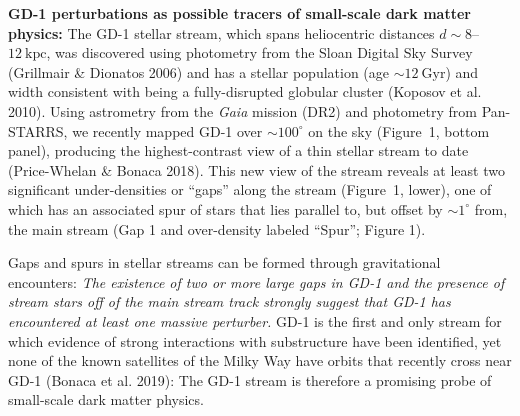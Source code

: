 \documentclass[11pt]{article}
\begin{document}
\textbf{GD-1 perturbations as possible tracers of small-scale dark matter physics:}
The GD-1 stellar stream, which spans heliocentric distances $d\sim 8$--$12~\textrm{kpc}$, was discovered using photometry from the Sloan Digital Sky Survey (Grillmair \& Dionatos 2006) and has a stellar population (age $\sim 12~\textrm{Gyr}$) and width consistent with being a fully-disrupted globular cluster (Koposov et al. 2010).
Using astrometry from the \textit{Gaia} mission (DR2) and photometry from Pan-STARRS, we recently mapped GD-1 over $\sim 100^\circ$ on the sky (Figure~1, bottom panel), producing the highest-contrast view of a thin stellar stream to date (Price-Whelan \& Bonaca 2018).
This new view of the stream reveals at least two significant under-densities or ``gaps'' along the stream (Figure~1, lower), one of which has an associated spur of stars that lies parallel to, but offset by $\sim1^\circ$ from, the main stream (Gap 1 and over-density labeled ``Spur''; Figure 1).

Gaps and spurs in stellar streams can be formed through gravitational encounters:
\emph{The existence of two or more large gaps in GD-1 and the presence of stream stars off of the main stream track strongly suggest that GD-1 has encountered at least one massive perturber.}
GD-1 is the first and only stream for which evidence of strong interactions with substructure have been identified, yet none of the known satellites of the Milky Way have orbits that recently cross near GD-1 (Bonaca et al. 2019):
The GD-1 stream is therefore a promising probe of small-scale dark matter physics.
\end{document}
